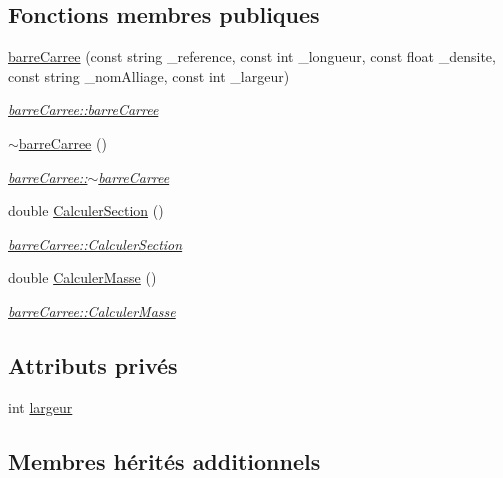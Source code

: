 \subsection*{Fonctions membres publiques}
\begin{DoxyCompactItemize}
\item 
\hyperlink{classbarre_carree_aff83dbd539a72ea608e0d976fe021e5a}{barre\+Carree} (const string \+\_\+reference, const int \+\_\+longueur, const float \+\_\+densite, const string \+\_\+nom\+Alliage, const int \+\_\+largeur)
\begin{DoxyCompactList}\small\item\em \hyperlink{classbarre_carree_aff83dbd539a72ea608e0d976fe021e5a}{barre\+Carree\+::barre\+Carree} \end{DoxyCompactList}\item 
\hyperlink{classbarre_carree_a586fa64f84b0d977472f520222ae7554}{$\sim$barre\+Carree} ()
\begin{DoxyCompactList}\small\item\em \hyperlink{classbarre_carree_a586fa64f84b0d977472f520222ae7554}{barre\+Carree\+::$\sim$barre\+Carree} \end{DoxyCompactList}\item 
double \hyperlink{classbarre_carree_ab7965489abcbac7f9e7d108f801c95e0}{Calculer\+Section} ()
\begin{DoxyCompactList}\small\item\em \hyperlink{classbarre_carree_ab7965489abcbac7f9e7d108f801c95e0}{barre\+Carree\+::\+Calculer\+Section} \end{DoxyCompactList}\item 
double \hyperlink{classbarre_carree_abc27ea4b81f19f699656dd0c037938ae}{Calculer\+Masse} ()
\begin{DoxyCompactList}\small\item\em \hyperlink{classbarre_carree_abc27ea4b81f19f699656dd0c037938ae}{barre\+Carree\+::\+Calculer\+Masse} \end{DoxyCompactList}\end{DoxyCompactItemize}
\subsection*{Attributs privés}
\begin{DoxyCompactItemize}
\item 
int \hyperlink{classbarre_carree_ad2090886607c393f6222239f3efaff0d}{largeur}
\end{DoxyCompactItemize}
\subsection*{Membres hérités additionnels}


